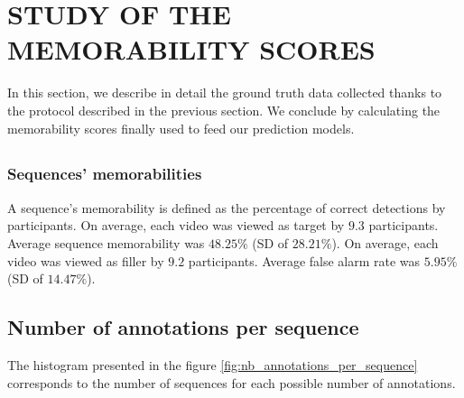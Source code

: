 \documentclass[sigconf]{acmart}
\begin{document}
\section{STUDY OF THE MEMORABILITY SCORES}
In this section, we describe in detail the ground truth data collected thanks to the protocol described in the previous section.
We conclude by calculating the memorability scores finally used to feed our prediction models.

\subsection{}

\subsubsection{Sequences' memorabilities}
A sequence's memorability is defined as the percentage of correct detections by participants.
On average, each video was viewed as target by $9.3$ participants. Average sequence memorability was $48.25\%$ (SD of $28.21\%$).
On average, each video was viewed as filler by $9.2$ participants. Average false alarm rate was $5.95\%$ (SD of $14.47\%$). 




\subsection{Number of annotations per sequence}
The histogram presented in the figure \ref{fig:nb_annotations_per_sequence} corresponds to the number of sequences for each possible number of annotations.
\end{document}
